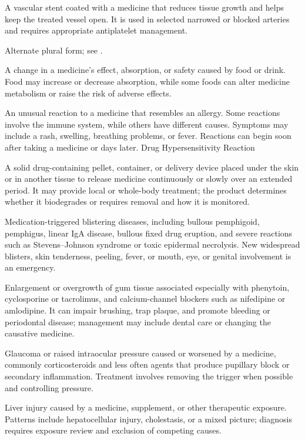  A vascular stent coated with a medicine that reduces tissue growth and helps keep the treated vessel open. It is used in selected narrowed or blocked arteries and requires appropriate antiplatelet management.

 Alternate plural form; see .

 A change in a medicine’s effect, absorption, or safety caused by food or drink. Food may increase or decrease absorption, while some foods can alter medicine metabolism or raise the risk of adverse effects.

 An unusual reaction to a medicine that resembles an allergy. Some reactions involve the immune system, while others have different causes. Symptoms may include a rash, swelling, breathing problems, or fever. Reactions can begin soon after taking a medicine or days later.
\synonyms
Drug Hypersensitivity Reaction


 A solid drug-containing pellet, container, or delivery device placed under the skin or in another tissue to release medicine continuously or slowly over an extended period. It may provide local or whole-body treatment; the product determines whether it biodegrades or requires removal and how it is monitored.


 Medication-triggered blistering diseases, including bullous pemphigoid, pemphigus, linear IgA disease, bullous fixed drug eruption, and severe reactions such as Stevens--Johnson syndrome or toxic epidermal necrolysis. New widespread blisters, skin tenderness, peeling, fever, or mouth, eye, or genital involvement is an emergency.

 Enlargement or overgrowth of gum tissue associated especially with phenytoin, cyclosporine or tacrolimus, and calcium-channel blockers such as nifedipine or amlodipine. It can impair brushing, trap plaque, and promote bleeding or periodontal disease; management may include dental care or changing the causative medicine.

 Glaucoma or raised intraocular pressure caused or worsened by a medicine, commonly corticosteroids and less often agents that produce pupillary block or secondary inflammation. Treatment involves removing the trigger when possible and controlling pressure.

 Liver injury caused by a medicine, supplement, or other therapeutic exposure. Patterns include hepatocellular injury, cholestasis, or a mixed picture; diagnosis requires exposure review and exclusion of competing causes.

